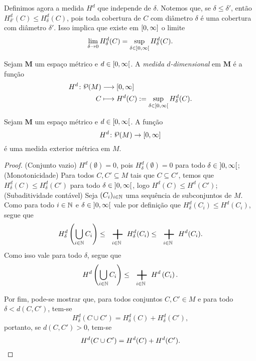 Definimos agora a medida $H^d$ que independe de $\delta$. Notemos que, se $\delta \leq \delta'$, então $H^d_{\delta'}(C) \leq H^d_\delta(C)$, pois toda cobertura de $C$ com diâmetro $\delta$ é uma cobertura com diâmetro $\delta'$. Isso implica que existe em $\left[0,\allowbreak \infty\right]$ o limite
	\begin{equation*}
	\lim_{\delta \rightarrow 0} H^d_\delta(C) = \sup_{\delta \in \left]0,\allowbreak \infty\right[} H^d_\delta(C).
	\end{equation*}

\begin{definition}
Sejam $\bm M$ um espaço métrico e $d \in \left[0,\allowbreak \infty\right[$. A \emph{medida $d$-dimensional} em $\bm M$ é a função
 	\begin{align*}
 	\func{H^d}{\p(M)}{\intff{0}{\infty}}{C}{H^d(C) := \sup_{\delta \in \intaa{0}{\infty}} H^d_\delta(C).}
 	\end{align*}
\end{definition}

\begin{proposition}
Sejam $\bm M$ um espaço métrico e $d \in \left[0,\allowbreak \infty\right[$. A função
	\begin{equation*}
	H^d\colon \p(M) \to \intff{0}{\infty}
	\end{equation*}
é uma medida exterior métrica em $M$.
\end{proposition}
\begin{proof}
(Conjunto vazio) $H^d(\emptyset)=0$, pois $H^d_\delta(\emptyset)=0$ para todo $\delta \in \left]0,\allowbreak \infty\right[$; (Monotonicidade) Para todos $C,C' \subseteq M$ tais que $C \subseteq C'$, temos que $H^d_\delta(C) \leq H^d_\delta(C')$ para todo $\delta \in \left]0,\allowbreak \infty\right[$, logo $H^d(C) \leq H^d(C')$; (Subaditividade contável) Seja $(C_i)_{i \in \mathbb{N}}$ uma sequência de subconjuntos de $M$. Como para todo $i \in \mathbb{N}$ e $\delta \in \left]0,\allowbreak \infty\right[$ vale por definição que $H^d_\delta(C_i) \leq H^d(C_i)$, segue que
	\begin{equation*}
	H^d_\delta\left( \bigcup_{i \in \N} C_i \right) \leq \sum_{i \in \N} H^d_\delta(C_i) \leq  \sum_{i \in \N} H^d(C_i).
	\end{equation*}
Como isso vale para todo $\delta$, segue que
	\begin{equation*}
	H^d\left( \bigcup_{i \in \N} C_i \right) \leq \sum_{i \in \N} H^d\left( C_i \right).
	\end{equation*}

Por fim, pode-se mostrar que, para todos conjuntos $C,C' \in M$ e para todo $\delta < d(C,C')$, tem-se
	\begin{equation*}
	H^d_\delta(C \cup C') = H^d_\delta(C) + H^d_\delta(C'),
	\end{equation*}
portanto, se $d(C,C') > 0$, tem-se
	\begin{equation*}
	H^d(C \cup C') = H^d(C) + H^d(C'). \qedhere
	\end{equation*}
\end{proof}


